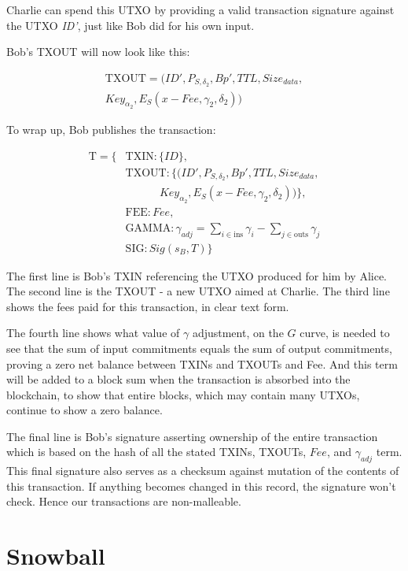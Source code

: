 \documentclass[a4paper, 10pt, conference]{ieeeconf}
\begin{document}
Charlie can spend this UTXO by providing a valid transaction signature against the UTXO \textit{ID'}, just like Bob did for his own input. 

Bob's TXOUT will now look like this:

\begin{multline*}
\text{TXOUT} = (ID', P_{S, \delta_2}, Bp', TTL, Size_{data},\\ 
                Key_{\alpha_2}, E_S(x - Fee, \gamma_2, \delta_2))
\end{multline*}

To wrap up, Bob publishes the transaction:

\begin{align*}
\text{T} = \{&\text{TXIN} : \{\mathit{ID}\}, \\
 &\text{TXOUT} : \{(ID', P_{S, \delta_2}, Bp', TTL, Size_{data}, \\
 & \ \ \ \ \ \ \ \ \ \ \ \ \ \ Key_{\alpha_2}, E_S(x - Fee, \gamma_2, \delta_2))\}, \\
 &\text{FEE} : \mathit{Fee}, \\
 &\text{GAMMA} : \gamma_{\mathit{adj}} = \sum_{i \in \text{ins}}{\gamma_i} - \sum_{j \in \text{outs}}{\gamma_j}\\
 &\text{SIG} : \mathit{Sig}(s_B, T)\}
\end{align*}

The first line is Bob's TXIN referencing the UTXO produced for him by Alice. The second line is the TXOUT - a new UTXO aimed at Charlie. The third line shows the fees paid for this transaction, in clear text form. 

The fourth line shows what value of $\gamma$ adjustment, on the $G$ curve, is needed to see that the sum of input commitments equals the sum of output commitments, proving a zero net balance between TXINs and TXOUTs and Fee. And this term will be added to a block sum when the transaction is absorbed into the blockchain, to show that entire blocks, which may contain many UTXOs, continue to show a zero balance.

The final line is Bob's signature asserting ownership of the entire transaction which is based on the hash of all the stated TXINs, TXOUTs, $Fee$, and $\gamma_{adj}$ term. This final signature also serves as a checksum against mutation of the contents of this transaction. If anything becomes changed in this record, the signature won't check. Hence our transactions are non-malleable.

\section{Snowball}\label{SnowballAppendix}
\end{document}

